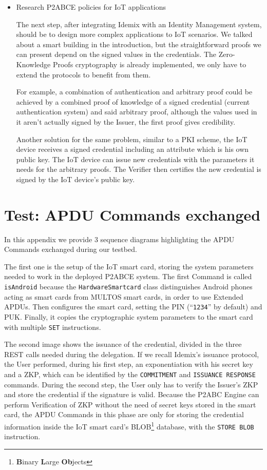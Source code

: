 \documentclass[journal]{IEEEtran}
\begin{document}
\begin{itemize}
	\item Research P2ABCE policies for IoT applications
	
	The next step, after integrating Idemix with an Identity Management system, should be to design more complex applications to IoT scenarios. We talked about a smart building in the introduction, but the straightforward proofs we can present depend on the signed values in the credentials. The Zero-Knowledge Proofs cryptography is already implemented, we only have to extend the protocols to benefit from them.
	
	For example, a combination of authentication and arbitrary proof could be achieved by a combined proof of knowledge of a signed credential (current authentication system) and said arbitrary proof, although the values used in it aren't actually signed by the Issuer, the first proof gives credibility.
	
	Another solution for the same problem, similar to a PKI scheme, the IoT device receives a signed credential including an attribute which is his own public key. The IoT device can issue new credentials with the parameters it needs for the arbitrary proofs. The Verifier then certifies the new credential is signed by the IoT device's public key.
	
\end{itemize}




\appendices


\section{Test: APDU Commands exchanged}\label{ch:resultsdiagrams}


In this appendix we provide 3 sequence diagrams highlighting the APDU Commands exchanged during our testbed. 


The first one is the setup of the IoT smart card, storing the system parameters needed to work in the deployed P2ABCE system. The first Command is called \texttt{isAndroid} because the \texttt{HardwareSmartcard} class distinguishes Android phones acting as smart cards from MULTOS smart cards, in order to use Extended APDUs. Then configures the smart card, setting the PIN (``\texttt{1234}'' by default) and PUK. Finally, it copies the cryptographic system parameters to the smart card with multiple \texttt{SET} instructions.

The second image shows the issuance of the credential, divided in the three REST calls needed during the delegation. If we recall Idemix's issuance protocol, the User performed, during his first step, an exponentiation with his secret key and a ZKP, which can be identified by the \texttt{COMMITMENT} and \texttt{ISSUANCE RESPONSE} commands. During the second step, the User only has to verify the Issuer's ZKP and store the credential if the signature is valid. Because the P2ABC Engine can perform Verification of ZKP without the need of secret keys stored in the smart card, the APDU Commands in this phase are only for storing the credential information inside the IoT smart card's BLOB\footnote{\textbf{B}inary \textbf{L}arge \textbf{Ob}jects} database, with the \texttt{STORE BLOB} instruction. 
\end{document}
